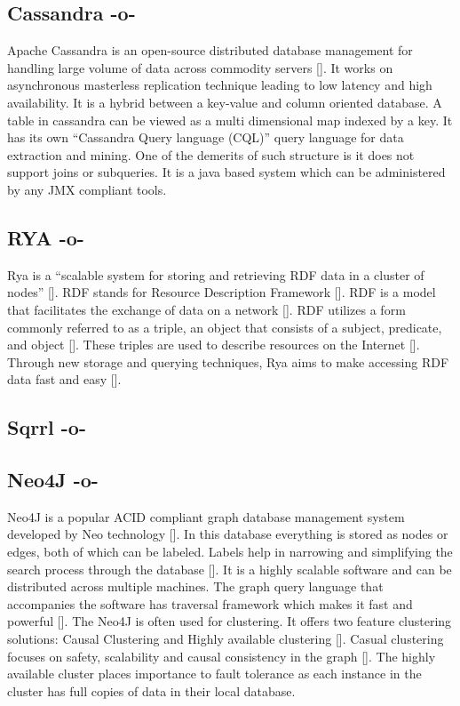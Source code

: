 \subsection{Cassandra -o-}

Apache Cassandra is an open-source distributed database management for
handling large volume of data across commodity
servers [\cite{www-cassandra}]. It works on asynchronous masterless
replication technique leading to low latency and high availability. It
is a hybrid between a key-value and column oriented database. A table
in cassandra can be viewed as a multi dimensional map indexed by a
key. It has its own ``Cassandra Query language (CQL)'' query language
for data extraction and mining. One of the demerits of such structure
is it does not support joins or subqueries. It is a java based system
which can be administered by any JMX compliant tools.



\subsection{RYA -o-}

Rya is a ``scalable system for storing and retrieving RDF data in a
cluster of nodes'' [\cite{Punnoose}]. RDF stands for Resource
Description Framework [\cite{Punnoose}]. RDF is a model that facilitates
the exchange of data on a network [\cite{w3}]. RDF utilizes a form
commonly referred to as a triple, an object that consists of a
subject, predicate, and object [\cite{Punnoose}].  These triples are
used to describe resources on the Internet [\cite{Punnoose}]. Through
new storage and querying techniques, Rya aims to make accessing RDF
data fast and easy [\cite{apacherya}].


     
\subsection{Sqrrl -o-}



\subsection{Neo4J -o-}

Neo4J is a popular ACID compliant graph database management system
developed by Neo technology [\cite{www-wiki-neo4j}].  In this database
everything is stored as nodes or edges, both of which can be
labeled. Labels help in narrowing and simplifying the search process
through the database [\cite{www-slideshare}]. It is a highly scalable
software and can be distributed across multiple machines.  The graph
query language that accompanies the software has traversal framework
which makes it fast and powerful [\cite{www-neo4j}]. The Neo4J is often
used for clustering. It offers two feature clustering solutions:
Causal Clustering and Highly available
clustering [\cite{www-neo4j-causal-cluster}]. Casual clustering focuses
on safety, scalability and causal consistency in the
graph [\cite{www-neo4j-HA-cluster}]. The highly available cluster places
importance to fault tolerance as each instance in the cluster has full
copies of data in their local database.



